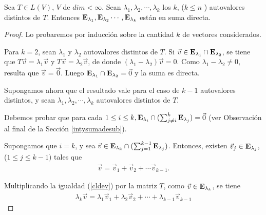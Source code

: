 \begin{corollary}

\label{Teosumad}



Sea $T\in L(V)$, $V$ de $dim<\infty$. Sean $\lambda_1,\lambda_2, \cdots,\lambda_k$ los $k$, ($k \leq n$ ) autovalores distintos de $T$. Entonces $\bold E_{\lambda_1}, \bold E_{\lambda_2}\cdots, \bold E_{\lambda_k}$ están en suma directa.

\begin{proof}

\noindent
Lo probaremos por inducción sobre la cantidad $k$ de vectores considerados.

Para $k=2$, sean $\lambda_1$ y $\lambda_2$ autovalores distintos de $T$. Si $\vec{v} \in \bold E_{\lambda_1} \cap \bold E_{\lambda_2}$, se tiene que $T\vec{v}=  \lambda_1 \vec{v}$ y $T\vec{v}=  \lambda_2 \vec{v}$, de donde $( \lambda_1- \lambda_2)\vec{v}=0  $. Como $\lambda_1- \lambda_2 \neq 0$, resulta que $\vec{v}= \vec{0}$. Luego $\bold E_{\lambda_1} \cap \bold E_{\lambda_2}  =  {\vec{0}}$ y la suma es directa.


\bigskip

Supongamos ahora que el resultado vale para el caso de $k-1$ autovalores distintos, y sean  
$\lambda_1,\lambda_2, \cdots,\lambda_k$  autovalores distintos  de $T$.



Debemos probar que para cada $1 \leq i \leq k, \bold E_{\lambda_i} \cap(\sum^{k}_{j \neq i}\bold E_{\lambda_j})={\vec{0}}  $ (ver Observación 
 \textcolor{blue}{{\selectfont{i}}}  al final de la Sección \ref{intysumadesub}).





\bigskip


Supongamos que $i=k$, y sea $ \vec{v} \in  \bold{E}_{\lambda_k} \cap(\sum^{k-1}_{j=1}\bold{E}_{\lambda_j})$. Entonces, existen $\vec v_j  \in \bold{E}_{\lambda_j}  $, ($1 \leq j \leq  k-1)$ tales que 
\begin{eqnarray}
\label{cldev}
\vec{v}=\vec v_1+ \vec v_2+   \cdots \vec v_{k-1}. 
\end{eqnarray}


Multiplicando la igualdad (\ref{cldev}) por la matriz $T$, como  $\vec{v} \in  \bold{E}_{\lambda_k}$, se tiene
\begin{eqnarray}
\lambda_k\vec{v}= \lambda_1 \vec v_1+\lambda_2 \vec v_2+   \cdots + \lambda_{k-1}\vec v_{k-1} 
\end{eqnarray}


\end{proof}
\end{corollary}
